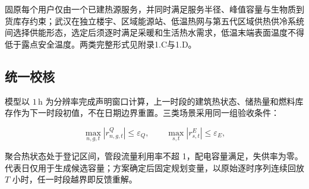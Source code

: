 固原每个用户仅由一个已建热源服务，并同时满足服务半径、峰值容量与生物质到货库存约束；武汉在独立楼宇、区域能源站、低温热网与第五代区域供热供冷系统间选择供能形态，选定后须逐时满足采暖和生活热水需求，低温末端表面温度不得低于露点安全温度。两类完整形式见附录1.C与1.D。

\subsection{统一校核}

模型以 $1\,\mathrm{h}$ 为分辨率完成声明窗口计算，上一时段的建筑热状态、储热量和燃料库存作为下一时段初值，不在日期边界重置。三类场景采用同一组验收条件：

\begin{equation}
\max_{n,g,t}|r_{n,g,t}^{Q}|\leq\varepsilon_Q,
\qquad
\max_{s,t}|r_{s,t}^{E}|\leq\varepsilon_E,
\label{eq:acceptance}
\end{equation}

聚合热状态处于登记区间，管段流量利用率不超 1，配电容量满足，失供率为零。代表日仅用于生成候选容量；方案确定后固定规划变量，以原始逐时序列连续回放 $T$ 小时，任一时段越界即反馈重解。
